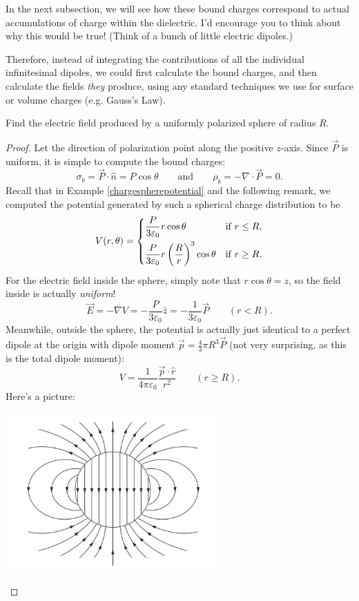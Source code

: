 \begin{remark}\label{boundchargeintuition}
In the next subsection, we will see how these bound charges correspond to actual accumulations of charge within the dielectric. I'd encourage you to think about why this would be true! (Think of a bunch of little electric dipoles.)
\end{remark}

Therefore, instead of integrating the contributions of all the individual infinitesimal dipoles, we could first calculate the bound charges, and then calculate the fields \textit{they} produce, using any standard techniques we use for surface or volume charges (e.g. Gauss's Law).

\begin{example}
Find the electric field produced by a uniformly polarized sphere of radius $R$.
\end{example}

\begin{proof}
Let the direction of polarization point along the positive $z$-axis. Since $\vec{P}$ is uniform, it is simple to compute the bound charges:
\[\sigma_b=\vec{P}\cdot \hat{n}=P\cos\theta \qquad \text{and} \qquad \rho_b=-\nabla\cdot\vec{P}=0.\]
Recall that in Example \ref{chargespherepotential} and the following remark, we computed the potential generated by such a spherical charge distribution to be
\[V(r,\theta)=\begin{dcases}
\frac{P}{3\varepsilon_0}r\cos\theta & \text{if } r\le R,\\
\frac{P}{3\varepsilon_0}r\left(\frac{R}{r}\right)^3\cos\theta & \text{if } r\ge R.
\end{dcases}\]
For the electric field inside the sphere, simply note that $r\cos\theta=z$, so the field inside is actually \textit{uniform}!
\[\vec{E}=-\nabla V=-\frac{P}{3\varepsilon_0}\hat{z}=-\frac{1}{3\varepsilon_0}\vec{P}\qquad (r<R).\]
Meanwhile, outside the sphere, the potential is actually just identical to a perfect dipole at the origin with dipole moment $\vec{p}=\frac{4}{3}\pi R^3\vec{P}$ (not very surprising, as this is the total dipole moment):
\[V=\frac{1}{4\pi\varepsilon_0}\frac{\vec{p}\cdot\hat{r}}{r^2}\qquad (r\ge R).\]
Here's a picture:
\begin{center}
    \includegraphics[width=8cm]{Electrodynamics/images/fig4.10.PNG}
\end{center}
\end{proof}

